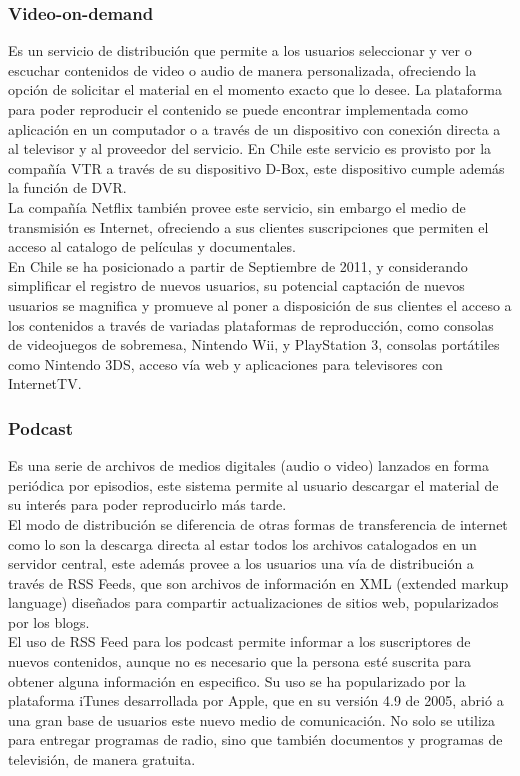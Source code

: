 \subsubsection{Video-on-demand}
Es un servicio de distribución que permite a los usuarios seleccionar y ver o escuchar contenidos de video o audio de manera personalizada, ofreciendo la opción de solicitar el material en el momento exacto que lo desee.  La plataforma para poder reproducir el contenido se puede encontrar implementada como aplicación en un computador o a través de un dispositivo con conexión directa a al televisor y al proveedor del servicio. En Chile este servicio es provisto por la compañía VTR a través de su dispositivo D-Box, este dispositivo cumple además la función de DVR.\\

La compañía Netflix también provee este servicio, sin embargo el medio de transmisión es Internet, ofreciendo a sus clientes suscripciones que permiten el acceso al catalogo de películas y documentales.\\

En Chile se ha posicionado a partir de Septiembre de 2011, y considerando simplificar el registro de nuevos usuarios, su potencial captación de nuevos usuarios se magnifica y promueve al poner a disposición de sus clientes el acceso a los contenidos a través de variadas plataformas de reproducción, como consolas de videojuegos de sobremesa, Nintendo Wii, y PlayStation 3, consolas portátiles como Nintendo 3DS, acceso vía web y aplicaciones para televisores con InternetTV. \\

\subsubsection{Podcast}
Es una serie de archivos de medios digitales (audio o video) lanzados en forma periódica por episodios, este sistema permite al usuario descargar el material de su interés para poder reproducirlo más tarde.\\

El modo de distribución se diferencia de otras formas de transferencia de internet como lo son la descarga directa al estar todos los archivos catalogados en un servidor central, este además provee a los usuarios una vía de distribución a través de RSS Feeds, que son archivos de información en XML (extended markup language) diseñados para compartir actualizaciones de sitios web, popularizados por los blogs.\\ 
El uso de RSS Feed para los podcast permite informar a los suscriptores de nuevos contenidos, aunque no es necesario que la persona esté suscrita para obtener alguna información en especifico. 
Su uso se ha popularizado por la plataforma iTunes desarrollada por Apple, que en su versión 4.9 de 2005, abrió a una gran base de usuarios este nuevo medio de comunicación. No solo se utiliza para entregar programas de radio, sino que también documentos y programas de televisión, de manera gratuita.\\

